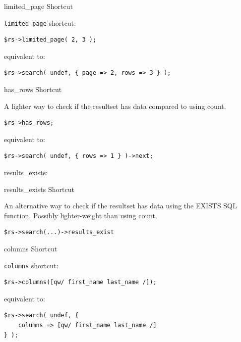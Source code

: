 \begin{frame}[fragile]{limited\_page Shortcut}

\verb|limited_page| shortcut:

\begin{lstlisting}
$rs->limited_page( 2, 3 );
\end{lstlisting}

equivalent to:

\begin{lstlisting}
$rs->search( undef, { page => 2, rows => 3 } );
\end{lstlisting}

\end{frame}

\begin{frame}[fragile]{has\_rows Shortcut}

A lighter way to check if the resultset has data compared to using count.

\begin{lstlisting}
$rs->has_rows;
\end{lstlisting}

equivalent to:

\begin{lstlisting}
$rs->search( undef, { rows => 1 } )->next;
\end{lstlisting}
\end{frame}

results\_exists:

\begin{frame}[fragile]{results\_exists Shortcut}

An alternative way to check if the resultset has data using the EXISTS SQL function. Possibly lighter-weight than using count.

\begin{lstlisting}
$rs->search(...)->results_exist
\end{lstlisting}
\end{frame}

\begin{frame}[fragile]{columns Shortcut}

\verb|columns| shortcut:

\begin{lstlisting}
$rs->columns([qw/ first_name last_name /]);
\end{lstlisting}

equivalent to:

\begin{lstlisting}
$rs->search( undef, { 
    columns => [qw/ first_name last_name /] 
} );
\end{lstlisting}

\end{frame}

